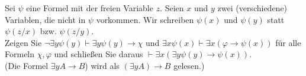 
\begin{exercise}[100]

Sei $\psi$ eine Formel mit der freien Variable $z$. Seien $x$ und $y$ zwei
(verschiedene) Variablen, die nicht in $\psi$ vorkommen. Wir schreiben $\psi(x)$
und $\psi(y)$ statt $\psi(z/x)$ bzw. $\psi(z/y)$. \\
Zeigen Sie $\neg \exists y \psi(y) \vdash \exists y \psi(y) \rightarrow \chi$
und $\exists x  \psi(x) \vdash \exists x (\varphi \rightarrow \psi(x))$
für alle Formeln $\chi, \varphi$ und schließen Sie daraus
$\vdash \exists x (\exists y \psi(y) \rightarrow \psi(x))$. \\
(Die Formel $\exists y A \rightarrow B$) wird als $(\exists y A) \rightarrow B$ gelesen.)

\end{exercise}



